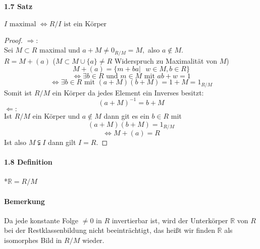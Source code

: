 \documentclass[a4paper]{article}
\begin{document}
\paragraph{1.7 Satz} $ I \text{ maximal } \iff R/I  \text{ ist ein Körper} $
\begin{proof}
      $\Rightarrow:$  \\
      Sei $ M \subset R $ maximal und $ a + M \neq 0_{R/M} = M, $ also $ a \notin M$. \\
      $ R = M + (a) $ ($ M \subset M \cup \{a\} \neq R $ Widerspruch zu Maximalität von $ M $) \\
      $$ M + (a) = \{m + ba | \text{ } w \in M, b \in R\} $$
      $$ \iff \exists b \in R \text{ und } m \in M \text{ mit } ab + w = 1$$ 
      $$ \iff  \exists b \in R \text{ mit } (a + M)(b + M) = 1 + M = 1_{R/M}$$ 
      Somit ist $ R/M $ ein Körper da jedes Element ein Inverses besitzt:
      $$ (a + M)^{-1} = b + M $$
      $\Leftarrow:$ \\
      Ist $ R/M $ ein Körper und $ a \notin M $ dann git es ein $ b \in R $ mit 
      $$ (a + M)(b + M) = 1_{R/M} $$
      $$ \iff M + (a) = R $$  
      Ist also $ M \subsetneqq I $ dann gilt $ I = R $. 
\end{proof}

\paragraph{1.8 Definition}  *$\mathbb{R} = R/M $

\paragraph{Bemerkung} Da jede konstante Folge $ \neq 0 $ in $ R $ invertierbar ist,
wird der Unterkörper $ \mathbb{R} $ von $ R $ bei der Restklassenbildung nicht beeinträchtigt, das heißt
wir finden $ \mathbb{R} $ als isomorphes Bild in $ R/M $ wieder.
\end{document}
